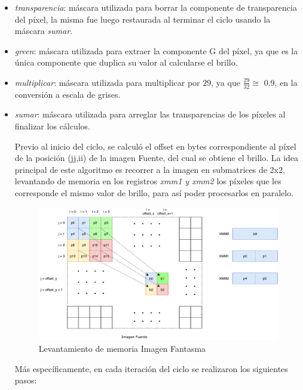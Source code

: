 \documentclass[a4paper]{article}
\begin{document}
\begin{itemize}
	\item \textit{transparencia}: máscara utilizada para borrar la componente de transparencia del píxel, la misma fue luego restaurada al terminar el ciclo usando la máscara \textit{sumar}.
	\item \textit{green}: máscara utilizada para extraer la componente G del píxel, ya que es la única componente que duplica su valor al calcularse el brillo.
	\item \textit{multiplicar}: máscara utilizada para multiplicar por $29$, ya que $\frac{29}{32} \cong $ 0.9, en la conversión a escala de grises.
	\item \textit{sumar}: máscara utilizada para arreglar las transparencias de los píxeles al finalizar los cálculos.
	
 Previo al inicio del ciclo, se calculó el offset en bytes correspondiente al píxel de la posición (jj,ii) de la imagen Fuente, del cual se obtiene el brillo. La idea principal de este algoritmo es recorrer a la imagen en submatrices de 2x2, levantando de memoria en los registros \textit{xmm1 y xmm2}  los píxeles que les corresponde el mismo valor de brillo, para así poder procesarlos en paralelo.
 \begin{figure}[h]
 	\centering
 	\includegraphics[scale = 0.6]{img/ImagenFantasma1.pdf}
 	\caption{Levantamiento de memoria Imagen Fantasma}
 \end{figure}
 
 Más específicamente, en cada iteración del ciclo se realizaron los siguientes pasos:
 

\end{itemize}
\end{document}
